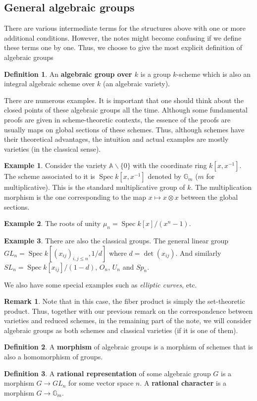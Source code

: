 \documentclass[12pt]{article}
\theoremstyle{remark}
\theoremstyle{definition}
\newtheorem{remark}{Remark}[section]
\newtheorem{example}{Example}[section]
\newtheorem{definition}{Definition}[section]
\newcommand{\G}[0]{\mathbb{G}}
\newcommand{\Spec}[0]{\operatorname{Spec}}
\begin{document}
    \subsection{General algebraic groups}
    There are various intermediate terms for the structures above with one or more additional conditions. However, the notes might become confusing if we define these terms one by one. Thus, we choose to give the most explicit definition of algebraic groups
    \begin{definition}
        An \textbf{algebraic group over $k$} is a group $k$-scheme which is also an integral algebraic scheme over $k$ (an algebraic variety).
    \end{definition}
    There are numerous examples. It is important that one should think about the closed points of these algebraic groups all the time. Although some fundamental proofs are given in scheme-theoretic contexts, the essence of the proofs are usually maps on global sections of these schemes. Thus, although schemes have their theoretical advantages, the intuition and actual examples are mostly varieties (in the classical sense).
    \begin{example}
        Consider the variety $\mathbb{A}\backslash\{0\}$ with the coordinate ring $k[x,x^{-1}]$. The scheme associated to it is $\Spec k[x, x^{-1}]$ denoted by $\G_m$ ($m$ for multiplicative). This is the standard multiplicative group of $k$. The multiplication morphism is the one corresponding to the map $x\mapsto x\otimes x$ between the global sections.
    \end{example}
    \begin{example}
        The roots of unity $\mu_n=\Spec k[x]/(x^n-1)$.
    \end{example}
    \begin{example}
        There are also the classical groups. The general linear group $GL_n=\Spec k[(x_{ij})_{i,j\leqslant n}, 1/d]$ where $d=\det (x_{ij})$. And similarly $SL_n=\Spec k[x_{ij}]/(1-d)$, $O_n$, $U_n$ and $Sp_n$.
    \end{example}
    We also have some special examples such as \textit{elliptic curves}, etc.
    \begin{remark}
        Note that in this case, the fiber product is simply the set-theoretic product. Thus, together with our previous remark on the correspondence between varieties and reduced schemes, in the remaining part of the note, we will consider algebraic groups as both schemes and classical varieties (if it is one of them).
    \end{remark}
    \begin{definition}
        A \textbf{morphism} of algebraic groups is a morphism of schemes that is also a homomorphism of groups.
    \end{definition}
    \begin{definition}
        A \textbf{rational representation} of some algebraic group $G$ is a morphism $G\to GL_n$ for some vector space $n$. A \textbf{rational character} is a morphism $G\to \mathbb G_m$.
    \end{definition}
\end{document}
